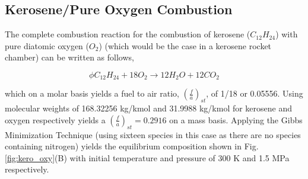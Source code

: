 \subsection{Kerosene/Pure Oxygen Combustion}

	The complete combustion reaction for the combustion of kerosene ($C_{12}H_{24}$) with
pure diatomic oxygen ($O_2$) (which would be the case in a kerosene rocket chamber) can be written as follows,

\begin{equation}
	\phi C_{12}H_{24} + 18 O_2 \longrightarrow 12 H_2O + 12 CO_2
\label{eqn:kerocombo2}
\end{equation}

	which on a molar basis yields a fuel to air ratio, $(\frac{f}{a})_{st}$, of 1/18 or 0.05556.  Using 
molecular weights of 168.32256 kg/kmol and 31.9988 kg/kmol for kerosene and oxygen respectively 
yields a $(\frac{f}{a})_{st} = 0.2916$ on a mass basis.  Applying the Gibbs Minimization Technique 
(using sixteen species in this case as there are no species containing nitrogen) yields
the equilibrium composition shown in Fig. \ref{fig:kero_oxy}(B) with initial temperature and pressure
of 300 K and 1.5 MPa respectively.

